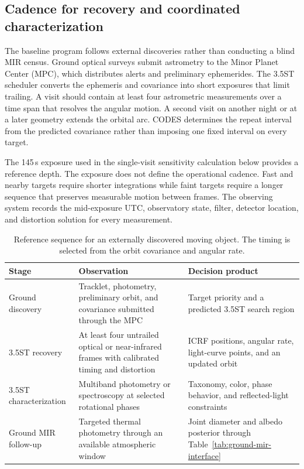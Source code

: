 \subsection{Cadence for recovery and coordinated characterization}

The baseline program follows external discoveries rather than conducting a
blind MIR census. Ground optical surveys submit astrometry to the Minor Planet
Center (MPC), which distributes alerts and preliminary ephemerides. The 3.5ST
scheduler converts the ephemeris and covariance into short exposures that
limit trailing. A visit should contain at least four astrometric measurements
over a time span that resolves the angular motion. A second visit on another
night or at a later geometry extends the orbital arc. CODES determines the
repeat interval from the predicted covariance rather than imposing one fixed interval on every
target.

The 145\,s exposure used in the single-visit sensitivity calculation below
provides a reference depth. The exposure does not define the operational
cadence. Fast and nearby targets require shorter integrations while faint
targets require a longer sequence that preserves measurable motion between
frames. The observing system records the mid-exposure UTC, observatory state,
filter, detector location, and distortion solution for every measurement.

\begin{table}[H]
\centering
\caption{Reference sequence for an externally discovered moving object.
The timing is selected from the orbit covariance and angular rate.}
\begin{tabularx}{\textwidth}{@{}P{35mm}P{48mm}Y@{}}
\toprule
\textbf{\color{cGold}Stage} &
\textbf{\color{cGold}Observation} &
\textbf{\color{cGold}Decision product}\\
\midrule
Ground discovery &
Tracklet, photometry, preliminary orbit, and covariance submitted through
the MPC &
Target priority and a predicted 3.5ST search region\\
3.5ST recovery &
At least four untrailed optical or near-infrared frames with calibrated
timing and distortion &
ICRF positions, angular rate, light-curve points, and an updated orbit\\
3.5ST characterization &
Multiband photometry or spectroscopy at selected rotational phases &
Taxonomy, color, phase behavior, and reflected-light constraints\\
Ground MIR follow-up &
Targeted thermal photometry through an available atmospheric window &
Joint diameter and albedo posterior through Table~\ref{tab:ground-mir-interface}\\
\bottomrule
\end{tabularx}
\label{tab:neo-coordinated-sequence}
\end{table}

